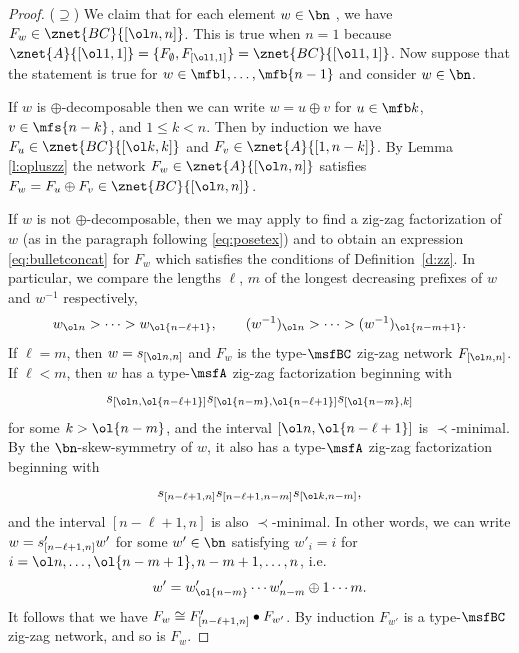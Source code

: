 \begin{proof}
  ($\supseteq$)
  We claim that for each element $w \in \bn$ \avoidingp,
  we have $F_w \in \znet{BC}{[\ol n, n]}$.
  This is true when $n = 1$ because
  $\znet{A}{[\ol1,1]} = \{ F_\emptyset, F_{[\ol1,1]} \} = \znet{BC}{[\ol1,1]}$.
  Now suppose that the
  statement is true
  for $w \in \mfb1,\dotsc,\mfb{n-1}$ and consider $w \in \bn$.

  If $w$ is $\oplus$-decomposable then we can write
  $w = u \oplus v$ for $u \in \mfb k$, $v \in \mfs{n-k}$, and
  $1 \leq k < n$.
  Then by induction we have $F_u \in \znet{BC}{[\ol k,k]}$ and
  $F_v \in \znet{A}{[1,n-k]}$.
By Lemma \ref{l:opluszz} the network $F_w \in \znet{A}{[\ol n,n]}$
satisfies
$F_w = F_u \oplus F_v \in \znet{BC}{[\ol n,n]}$.

If
$w$ is not $\oplus$-decomposable,
then we may apply \cite[Obs.\,3.3]{SkanNNDCB} to find a zig-zag factorization
of $w$ (as in the paragraph following \eqref{eq:posetex})
and to obtain an expression \eqref{eq:bulletconcat}
for $F_w$ which satisfies the conditions of Definition~\ref{d:zz}.
In particular, we compare the lengths $\ell$, $m$
of the longest decreasing prefixes of $w$ and $w^{-1}$ respectively,
\begin{equation*}
  w_{\smash{\ol n}} > \cdots > w_{\smash{\ol{n-\ell+1}}},
  \qquad (w^{-1})_{\smash{\ol n}} > \cdots > (w^{-1})_{\smash{\ol{n-m+1}}}.
\end{equation*}
If $\ell = m$, then $w = s_{\smash{[\ol n, n]}}$ and $F_w$ is the type-$\msfBC$
zig-zag network $F_{\smash{[\ol n,n]}}$.
If $\ell < m$, then $w$ has a type-$\msfA$ zig-zag factorization beginning
with
\begin{equation*}
  s_{\smash{[\ol n, \ol{n-\ell+1}]}}s_{\smash{[\ol{n-m},\ol{n-\ell+1}]}}s_{\smash{[\ol{n-m},k]}}
\end{equation*}
for some $k > \ol{n-m}$,
and the interval $[\ol n, \ol{n-\ell+1}]$ is $\prec$-minimal.
By the $\bn$-skew-symmetry of $w$,
it also has a type-$\msfA$ zig-zag factorization beginning with
\begin{equation*}
  s_{[n-\ell+1,n]}s_{[n-\ell+1,n-m]}s_{\smash{[\ol k,n-m]}},
\end{equation*}
and the interval $[n-\ell+1,n]$ is also $\prec$-minimal.
In other words, we can write $w = s'_{\smash{[n-\ell+1,n]}}w'$
for some $w' \in \bn$ satisfying
$w'_i = i$ for $i = \ol n, \dotsc, \ol{n-m+1}, n-m+1,\dotsc,n$, i.e. \begin{equation*}
  w' = %
  w'_{\smash{\ol{n-m}}} \cdots w'_{n-m} \oplus 1 \cdots m.
\end{equation*}
It follows that we have $F_w \cong F'_{\smash{[n-\ell+1,n]}} \bullet F_{w'}$.
By induction $F_{w'}$ is a type-$\msfBC$ zig-zag network, and so is $F_w$.
\end{proof}




